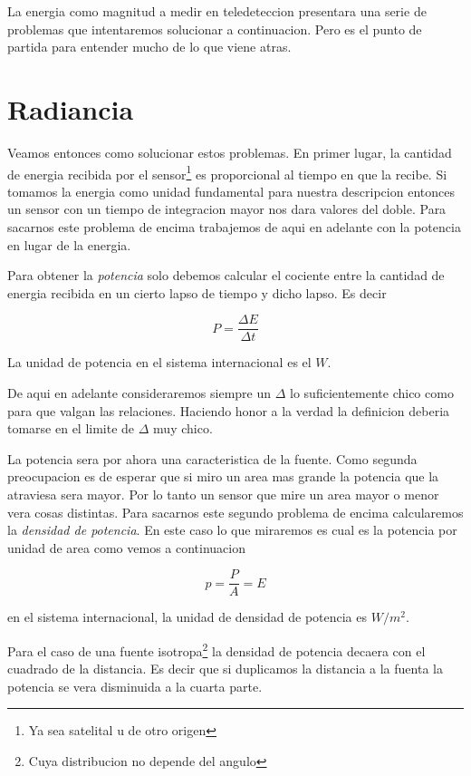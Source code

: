 La energia como magnitud a medir en teledeteccion presentara una serie de
problemas que intentaremos solucionar a continuacion. Pero es el punto de
partida para entender mucho de lo que viene atras.

\section{Radiancia}

Veamos entonces como solucionar estos problemas. En primer lugar, la cantidad de
energia recibida por el sensor\footnote{Ya sea satelital u de otro origen} es
proporcional al tiempo en que la recibe. Si tomamos la energia como unidad
fundamental para nuestra descripcion entonces un sensor con un tiempo de
integracion mayor nos dara valores del doble. Para sacarnos este problema de
encima trabajemos de aqui en adelante con la potencia en lugar de la energia.

Para obtener la \emph{potencia} solo debemos calcular el cociente entre la
cantidad de energia recibida en un cierto lapso de tiempo y dicho lapso. Es
decir

\begin{equation}
  P = \frac{\Delta E}{\Delta t}
\end{equation}

La unidad de potencia en el sistema internacional es el $W$.

\begin{obs}
  De aqui en adelante consideraremos siempre un $\Delta$ lo suficientemente chico
  como para que valgan las relaciones. Haciendo honor a la verdad la definicion
  deberia tomarse en el limite de $\Delta$ muy chico.
\end{obs}

La potencia sera por ahora una caracteristica de la fuente. Como segunda
preocupacion es de esperar que si miro un area mas grande la potencia que la
atraviesa sera mayor. Por lo tanto un sensor que mire un area mayor o menor vera
cosas distintas. Para sacarnos este segundo problema de encima calcularemos la
\emph{densidad de potencia}. En este caso lo que miraremos es cual es la
potencia por unidad de area como vemos a continuacion

\begin{equation}
  p = \frac{P}{A} = E
\end{equation}

en el sistema internacional, la unidad de densidad de potencia es $W/m^2$.

Para el caso de una fuente isotropa\footnote{Cuya distribucion no depende del
angulo} la densidad de potencia decaera con el cuadrado de la distancia. Es
decir que si duplicamos la distancia a la fuenta la potencia se vera disminuida
a la cuarta parte.

